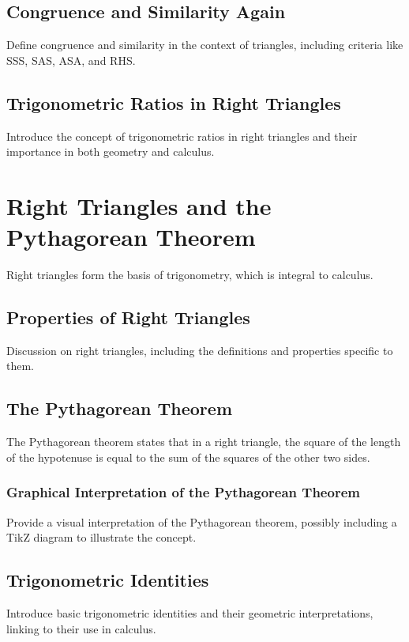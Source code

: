 \documentclass[a4paper,12pt]{book}
\begin{document}
\subsection{Congruence and Similarity Again}
\label{subsec:congruence_and_similarity}
Define congruence and similarity in the context of triangles, including criteria like SSS, SAS, ASA, and RHS.

\subsection{Trigonometric Ratios in Right Triangles}
\label{subsec:trigonometric_ratios}
Introduce the concept of trigonometric ratios in right triangles and their importance in both geometry and calculus.


\section{Right Triangles and the Pythagorean Theorem}
\label{sec:right_triangles_pythagorean}
Right triangles form the basis of trigonometry, which is integral to calculus.


\subsection{Properties of Right Triangles}
\label{subsec:properties_right_triangles}
Discussion on right triangles, including the definitions and properties specific to them.


\subsection{The Pythagorean Theorem}
\label{subsec:pythagorean_theorem}
The Pythagorean theorem states that in a right triangle, the square of the length of the hypotenuse is equal to the sum of the squares of the other two sides.


\subsubsection{Graphical Interpretation of the Pythagorean Theorem}
\label{subsubsec:graphical_pythagorean}
Provide a visual interpretation of the Pythagorean theorem, possibly including a TikZ diagram to illustrate the concept.


\subsection{Trigonometric Identities}
\label{subsec:trigonometric_identities}
Introduce basic trigonometric identities and their geometric interpretations, linking to their use in calculus.
\end{document}
